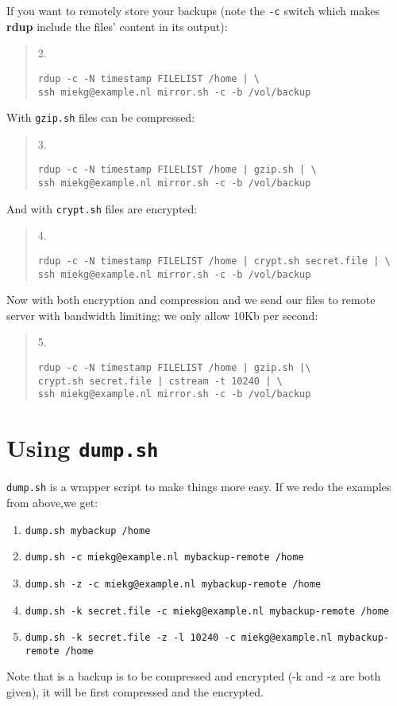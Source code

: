 \documentclass[a4paper, openany]{memoir}
\newcommand{\rdup}{\textbf{rdup}}
\newcommand{\cmd}[1]{\texttt{#1}}
\begin{document}
\noindent If you want to remotely store your backups (note the \cmd{-c} switch which makes
\rdup{} include the files' content in its output):
\begin{quote}
2.
\begin{verbatim}
rdup -c -N timestamp FILELIST /home | \
ssh miekg@example.nl mirror.sh -c -b /vol/backup
\end{verbatim}
\end{quote}

\noindent With \cmd{gzip.sh} files can be compressed:
\begin{quote}
3.
\begin{verbatim}
rdup -c -N timestamp FILELIST /home | gzip.sh | \
ssh miekg@example.nl mirror.sh -c -b /vol/backup
\end{verbatim}
\end{quote}

\noindent And with \cmd{crypt.sh} files are encrypted:
\begin{quote}
4.
\begin{verbatim}
rdup -c -N timestamp FILELIST /home | crypt.sh secret.file | \
ssh miekg@example.nl mirror.sh -c -b /vol/backup
\end{verbatim}
\end{quote}

\noindent Now with both encryption and compression and we 
send our files to remote server with bandwidth limiting; we
only allow 10Kb per second:
\begin{quote}
5.
\begin{verbatim}
rdup -c -N timestamp FILELIST /home | gzip.sh |\
crypt.sh secret.file | cstream -t 10240 | \
ssh miekg@example.nl mirror.sh -c -b /vol/backup
\end{verbatim}
\end{quote}

\section{Using \cmd{dump.sh}}
\cmd{dump.sh} is a wrapper script to make things more easy. If we redo
the examples from above,we get:
\begin{enumerate}
\item{\cmd{dump.sh mybackup /home}}
\item{\cmd{dump.sh -c miekg@example.nl mybackup-remote /home}}
\item{\cmd{dump.sh -z -c miekg@example.nl mybackup-remote /home}}
\item{\cmd{dump.sh -k secret.file -c miekg@example.nl mybackup-remote /home}}
\item{\cmd{dump.sh -k secret.file -z -l 10240 -c miekg@example.nl mybackup-remote /home}}
\end{enumerate}
Note that is a backup is to be compressed and encrypted (-k and -z are
both given), it will be first compressed and the encrypted.
\end{document}
